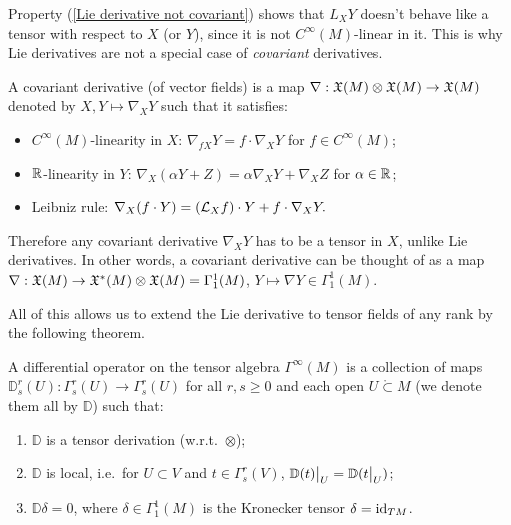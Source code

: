 \begin{rem}\label{rem: Lie derivatives not covariant}
    Property (\ref{Lie derivative not covariant}) shows that $L_X Y$ doesn't behave like a tensor with respect to $X$ (or $Y$), since it is not $C^\infty(M)$-linear in it. This is why Lie derivatives are not a special case of \emph{covariant} derivatives.
    
    A covariant derivative (of vector fields) is a map $\nabla:\mathfrak{X}(M)\otimes\mathfrak{X}(M)\to \mathfrak{X}(M)$ denoted by $X,Y\mapsto \nabla_X Y$ such that it satisfies:
    \begin{itemize}
        \item $C^\infty(M)$-linearity in $X$: $\nabla_{fX}Y=f\cdot \nabla_X Y$ for $f\in C^\infty(M)$;
        \item $\mathbb{R} $-linearity in $Y$: $\nabla_X (\alpha Y+Z)=\alpha \nabla_XY+\nabla_XZ$ for $\alpha\in\mathbb{R} $;
        \item Leibniz rule: $\nabla_X(f\cdot Y)=(\mathcal{L}_X f)\cdot Y+f\cdot \nabla_X Y.$
    \end{itemize}
    Therefore any covariant derivative $\nabla_X Y$ has to be a tensor in $X$, unlike Lie derivatives. In other words, a covariant derivative can be thought of as a map $\nabla:\mathfrak{X}(M)\to \mathfrak{X}^\ast(M)\otimes\mathfrak{X}(M)=\Gamma^1_1(M)$, $Y\mapsto \nabla Y\in\Gamma^1_1(M)$.
\end{rem}

All of this allows us to extend the Lie derivative to tensor fields of any rank by the following theorem.

\begin{defn}
A differential operator on the tensor algebra $\Gamma^\infty(M)$ is a collection of maps $\mathbb{D}^r_s(U):\Gamma^r_s(U)\to \Gamma^r_s(U)$ for all $r,s\geq 0$ and each open $U\mathring{\subset}M$ (we denote them all by $\mathbb{D}$) such that:
\begin{enumerate}
    \item $\mathbb{D}$ is a tensor derivation (w.r.t.\ $\otimes$);
    \item $\mathbb{D}$ is local, i.e.\ for $U\subset V$ and $t\in\Gamma^r_s(V)$, $\restr{\mathbb{D}(t)}{U}=\mathbb{D}(\restr{t}{U})$;
    \item $\mathbb{D} \delta=0$, where $\delta\in\Gamma^1_1(M)$ is the Kronecker tensor $\delta=\operatorname{id}_{TM}$.
\end{enumerate}
\end{defn}

